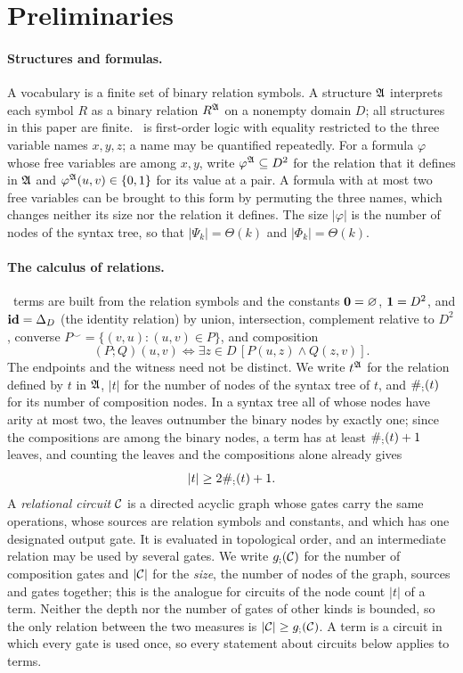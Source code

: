 \section{Preliminaries}\label{sec:aggregation}
\paragraph{Structures and formulas.}
A vocabulary is a finite set of binary relation symbols. A structure $\mathfrak A$
interprets each symbol $R$ as a binary relation $R^{\mathfrak A}$ on a nonempty
domain $D$; all structures in this paper are finite. \FOthree\ is
first-order logic with equality restricted to the three variable names
$x,y,z$; a name may be quantified repeatedly. For a formula $\varphi$ whose
free variables are among $x,y$, write $\varphi^{\mathfrak A}\subseteq D^2$ for the
relation that it defines in $\mathfrak A$ and $\varphi^{\mathfrak A}(u,v)\in\{0,1\}$ for its
value
at a pair. A formula with at most two free variables can be brought to this
form by permuting the three names, which changes neither its size nor the
relation it defines. The size $|\varphi|$ is the number of nodes of the
syntax tree,
so that $|\Psi_k|=\Theta(k)$ and $|\Phi_k|=\Theta(k)$.

\paragraph{The calculus of relations.}
\CoR\ terms are built from the relation symbols and the constants
$\mathbf{0}=\varnothing$, $\mathbf{1}=D^2$, and $\mathbf{id}=\Delta_D$ (the identity relation) by
union, intersection, complement relative to $D^2$, converse
$P^\smile=\{(v,u):(u,v)\in P\}$, and composition
\[
 (P;Q)(u,v)\iff\exists z\in D\,[P(u,z)\land Q(z,v)].
\]
The endpoints and the witness need not be distinct. We write $t^{\mathfrak A}$ for
the relation defined by $t$ in $\mathfrak A$, $|t|$ for the number of nodes of the
syntax tree of $t$, and $\#_{;}(t)$ for its number of composition nodes. In a
syntax tree all of whose nodes have arity at most two, the leaves outnumber
the binary nodes by exactly one; since the compositions are among the
binary nodes, a term has at least $\#_{;}(t)+1$ leaves, and counting the
leaves and the compositions alone already gives
\begin{equation}\label{eq:tree-size}
 |t|\ge2\#_{;}(t)+1.
\end{equation}
A \emph{relational circuit} $\mathcal C$ is a directed acyclic graph whose gates
carry the same operations, whose sources are relation symbols and constants,
and which has one designated output gate. It is evaluated in topological
order, and an intermediate relation may be used by several gates. We write
$g_{;}(\mathcal C)$ for the number of composition gates and $|\mathcal C|$ for the
\emph{size}, the number of nodes of the graph, sources and gates together;
this is the analogue for circuits of the node count $|t|$ of a term.
Neither the depth nor the number of gates of other kinds is bounded, so the
only relation between the two measures is $|\mathcal C|\ge g_{;}(\mathcal C)$. A term
is a circuit
in which every gate is used once, so every statement about circuits below
applies to terms.

